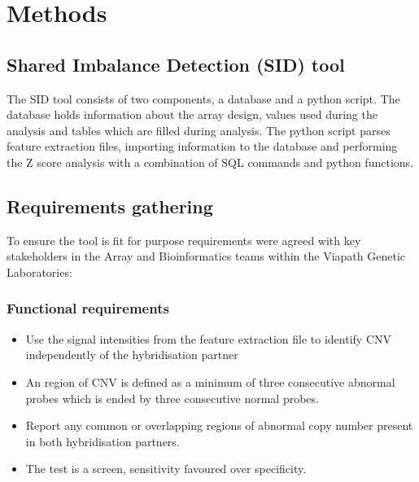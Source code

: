 \chapter{Methods}\label{ch:Methods}
\section{Shared Imbalance Detection (SID) tool}
The \ac{SID} tool consists of two components, a database and a python script. The database holds information about the array design, values used during the analysis and tables which are filled during analysis. The python script parses feature extraction files, importing information to the database and performing the Z score analysis with a combination of SQL commands and python functions.

\section{Requirements gathering}\label{Requirements}
To ensure the tool is fit for purpose requirements were agreed with key stakeholders in the Array and Bioinformatics teams within the Viapath Genetic Laboratories:
\subsection{Functional requirements}
\begin{itemize}
\item Use the signal intensities from the feature extraction file to identify \ac{CNV} independently of the hybridisation partner
\item An region of \ac{CNV} is defined as a minimum of three consecutive abnormal probes which is ended by three consecutive normal probes.
\item Report any common or overlapping regions of abnormal copy number present in both hybridisation partners.
\item The test is a screen, sensitivity favoured over specificity.
\end{itemize}
